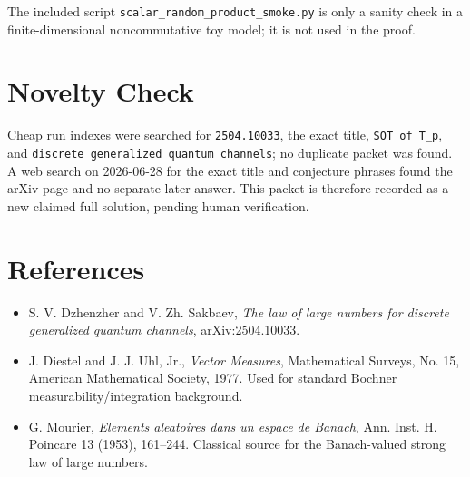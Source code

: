 \documentclass[11pt]{article}
\begin{document}
The included script \texttt{scalar\_random\_product\_smoke.py} is only a sanity check in a finite-dimensional noncommutative toy model; it is not used in the proof.

\section*{Novelty Check}

Cheap run indexes were searched for \texttt{2504.10033}, the exact title, \texttt{SOT of T\_p}, and \texttt{discrete generalized quantum channels}; no duplicate packet was found.  A web search on 2026-06-28 for the exact title and conjecture phrases found the arXiv page and no separate later answer.  This packet is therefore recorded as a new claimed full solution, pending human verification.

\section*{References}

\begin{itemize}[leftmargin=2em]
\item S. V. Dzhenzher and V. Zh. Sakbaev, \emph{The law of large numbers for discrete generalized quantum channels}, arXiv:2504.10033.
\item J. Diestel and J. J. Uhl, Jr., \emph{Vector Measures}, Mathematical Surveys, No. 15, American Mathematical Society, 1977.  Used for standard Bochner measurability/integration background.
\item G. Mourier, \emph{Elements aleatoires dans un espace de Banach}, Ann. Inst. H. Poincare 13 (1953), 161--244.  Classical source for the Banach-valued strong law of large numbers.
\end{itemize}
\end{document}
